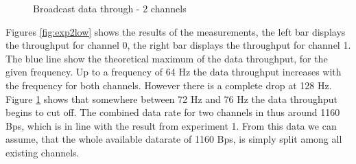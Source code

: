 \begin{description}
\begin{figure}[h]
		\caption{Broadcast data through - 2 channels}\label{fig:exp2high}
	\end{figure}
	Figures \ref{fig:exp2low} shows the results of the measurements, the left bar displays the throughput for channel 0, the right bar displays the throughput for channel 1. The blue line show the theoretical maximum of the data throughput, for the given frequency. Up to a frequency of 64 Hz the data throughput increases with the frequency for both channels. However there is a complete drop at 128 Hz. Figure \ref{fig:exp2high} shows that somewhere between 72 Hz and 76 Hz the data throughput begins to cut off. The combined data rate for two channels in thus around 1160 Bps, which is in line with the result from experiment 1. From this data we can assume, that the whole available datarate of 1160 Bps, is simply split among all existing channels.
\end{description}
\newpage
\newpage


